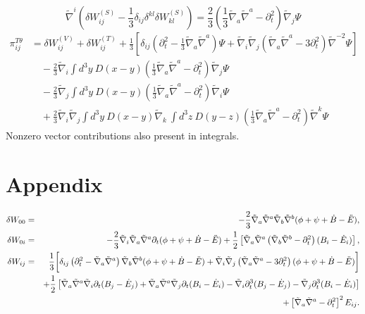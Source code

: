 \documentclass[10pt,letterpaper]{article}
\begin{document}
\begin{equation}
\tilde\nabla^i\left(\delta W_{ij}^{(S)} -\frac13 \delta_{ij} \delta^{kl}\delta W^{(S)}_{kl}\right) = \frac23 \left(\frac13 \tilde\nabla_a\tilde\nabla^a - \partial_t^2\right)\tilde\nabla_j \Psi
\end{equation}
\begin{align}
\pi_{ij}^{T\theta} &= \delta W_{ij}^{(V)}+\delta W_{ij}^{(T)} + \frac13\left[
\delta_{ij}\left( \partial_t^2 - \frac13 \tilde\nabla_a\tilde\nabla^a\right)\Psi +\tilde{\nabla}_i\tilde{\nabla}_j \left(\tilde{\nabla}_a\tilde{\nabla}^a-3\partial_t^2\right)\tilde\nabla^{-2}\Psi\right]
\nonumber
\\ &\quad  - \frac 23 \tilde\nabla_i \int d^3y\ D(x-y)  \left(\frac13 \tilde\nabla_a\tilde\nabla^a - \partial_t^2\right)\tilde\nabla_j \Psi
\nonumber \\
&\quad  - \frac 23 \tilde\nabla_j \int d^3y\ D(x-y)  \left(\frac13 \tilde\nabla_a\tilde\nabla^a - \partial_t^2\right)\tilde\nabla_i \Psi
\nonumber\\
&\quad  
+\frac23 \tilde\nabla_i\tilde\nabla_j \int d^3y\ D(x-y) \tilde\nabla_k\ \int d^3z\ D(y-z)  \left(\frac13 \tilde\nabla_a\tilde\nabla^a - \partial_t^2\right)\tilde\nabla^k \Psi
\end{align}
Nonzero vector contributions also present in integrals. 
\newpage
\section*{Appendix}
\begin{eqnarray}
\delta W_{00}  &=& -\frac{2}{3} \tilde{\nabla}_a\tilde{\nabla}^a\tilde{\nabla}_b\tilde{\nabla}^b (\phi + \psi +\dot{B}-\ddot{E}),
\nonumber\\	
\delta W_{0i} &=&  -\frac{2}{3}\tilde{\nabla}_i\tilde{\nabla}_a\tilde{\nabla}^a\partial_t(\phi +\psi +\dot{B}-\ddot{E})
	+\frac{1}{2}\left[ \tilde{\nabla}_a\tilde{\nabla}^a\left(\tilde{\nabla}_b\tilde{\nabla}^b-\partial_t^2\right)(B_i - \dot{E}_i) \right],
\nonumber\\	
\delta W_{ij}  &=& \frac{1}{3}\bigg{[} \delta_{ij}\left(\partial_t^2-\tilde\nabla_a\tilde\nabla^a\right)\tilde{\nabla}_b\tilde{\nabla}^b (\phi+ \psi+\dot{B}-\ddot{E}) +\tilde{\nabla}_i\tilde{\nabla}_j \left(\tilde{\nabla}_a\tilde{\nabla}^a-3\partial_t^2\right)(\phi + \psi +\dot{B}-\ddot{E})\bigg]
\nonumber\\
&&+\frac{1}{2}\left[ \tilde{\nabla}_{a}\tilde{\nabla}^a \tilde{\nabla}_i   \partial_t(B_j - \dot{E}_j)+\tilde{\nabla}_{a}\tilde{\nabla}^a \tilde{\nabla}_j \partial_t(B_i - \dot{E}_i) - \tilde{\nabla}_i\partial_t^3(B_j - \dot{E}_j)-\tilde{\nabla}_j\partial_t^3(B_i - \dot{E}_i)\right]
\nonumber\\
&&+\left[\tilde{\nabla}_a\tilde{\nabla}^a-\partial_t^2\right]^2E_{ij}.
\end{eqnarray}
\end{document}
